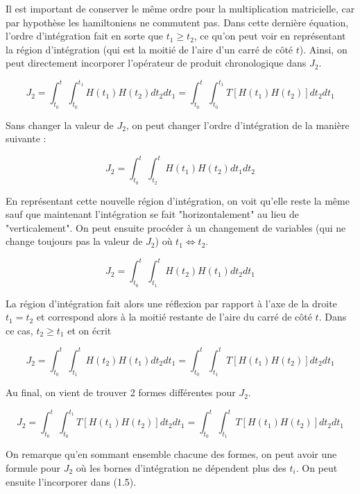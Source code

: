 Il est important de conserver le même ordre pour la multiplication matricielle, car par hypothèse les hamiltoniens ne commutent pas. Dans cette dernière équation, l'ordre d'intégration fait en sorte que $t_1 \geq t_2$, ce qu'on peut voir en représentant la région d'intégration (qui est la moitié de l'aire d'un carré de côté $t$). Ainsi, on peut directement incorporer l'opérateur de produit chronologique dans $J_2$.

\begin{equation*}
    J_2 = \int_{t_0}^{t}\int_{t_0}^{t_1}H(t_1)H(t_2)dt_2dt_1  = \int_{t_0}^{t}\int_{t_0}^{t_1}T\left[H(t_1)H(t_2)\right]dt_2dt_1
\end{equation*}

Sans changer la valeur de $J_2$, on peut changer l'ordre d'intégration de la manière suivante :

\begin{equation*}
    J_2 = \int_{t_0}^{t}\int_{t_2}^{t}H(t_1)H(t_2)dt_1dt_2
\end{equation*}

En représentant cette nouvelle région d'intégration, on voit qu'elle reste la même sauf que maintenant l'intégration se fait "horizontalement" au lieu de "verticalement". On peut ensuite procéder à un changement de variables (qui ne change toujours pas la valeur de $J_2$) où $t_1 \Leftrightarrow t_2$. 

\begin{equation*}
    J_2 = \int_{t_0}^{t}\int_{t_1}^{t}H(t_2)H(t_1)dt_2dt_1
\end{equation*}

La région d'intégration fait alors une réflexion par rapport à l'axe de la droite $t_1=t_2$ et correspond alors à la moitié restante de l'aire du carré de côté $t$. Dans ce cas, $t_2 \geq t_1$ et on écrit 

\begin{equation*}
    J_2 = \int_{t_0}^{t}\int_{t_1}^{t}H(t_2)H(t_1)dt_2dt_1 = \int_{t_0}^{t}\int_{t_1}^{t}T\left[H(t_1)H(t_2)\right]dt_2dt_1
\end{equation*}

Au final, on vient de trouver 2 formes différentes pour $J_2$.

\begin{equation}
    J_2 = \int_{t_0}^{t}\int_{t_0}^{t_1}T\left[H(t_1)H(t_2)\right]dt_2dt_1 = \int_{t_0}^{t}\int_{t_1}^{t}T\left[H(t_1)H(t_2)\right]dt_2dt_1
\end{equation}

On remarque qu'en sommant ensemble chacune des formes, on peut avoir une formule pour $J_2$ où les bornes d'intégration ne dépendent plus des $t_i$. On peut ensuite l'incorporer dans (1.5).

